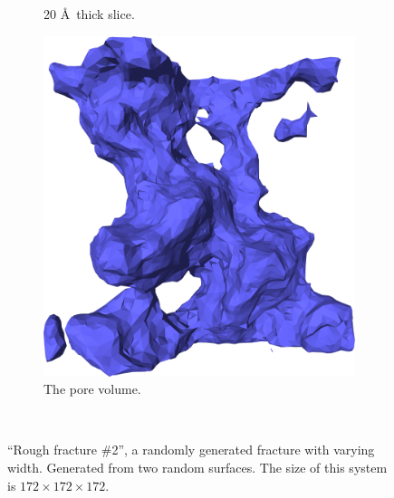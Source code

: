 \begin{figure}[!p]
{\begin{subfigure}[t]{\myfigwidth}
            \caption{20 \AA\ thick slice.}%
        \end{subfigure}%
        \hspace{\myhfillwidth}%
        \begin{subfigure}[t]{\myfigwidth}%
            \centering%
            \includegraphics[width=\textwidth]{images/systems/trimmed-rough_fracture03_11}%
            \caption{The pore volume.}%
        \end{subfigure}%
    }%
    \vspace{10pt}\\%
    \caption{%
        ``Rough fracture \#2'', a randomly generated fracture with varying width. Generated from two random surfaces. The size of this system is $172 \times 172 \times 172$.%
        \label{fig:renderings_rough_fracture03}%
    }%
\end{figure}%



